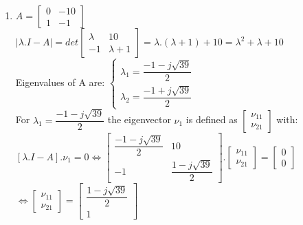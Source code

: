 \documentclass[14pt,a4paper]{article}
\begin{document}
\begin{enumerate}
	\item
		$A = \begin{bmatrix} 0&-10 \\ 1&-1 \end{bmatrix} $ \\
		$|\lambda .I - A| = det\begin{bmatrix} \lambda & 10 \\ -1 & \lambda +1 \end{bmatrix} = \lambda .(\lambda +1) +10 = \lambda^2 +\lambda +10 $ \\
		Eigenvalues of A are: 
		$\begin{cases} \lambda_1 = \dfrac{-1-j\sqrt{39}}{2}  \\ \lambda_2 = \dfrac{-1+j\sqrt{39}}{2}\end{cases} $ \\
		
		For $\lambda_1 = \dfrac{-1-j\sqrt{39}}{2}$ the eigenvector $\nu_1$ is defined as $\begin{bmatrix}\nu_{11}\\ \nu_{21} \end{bmatrix}$ with: \\
		$[\lambda .I - A].\nu_1 = 0 \Leftrightarrow \begin{bmatrix} \dfrac{-1-j\sqrt{39}}{2} & 10 \\ -1 & \dfrac{1-j\sqrt{39}}{2} \end{bmatrix} .\begin{bmatrix}\nu_{11}\\ \nu_{21} \end{bmatrix} = \begin{bmatrix} 0\\0 \end{bmatrix} $ \\
		$ \Leftrightarrow \begin{bmatrix} \nu_{11} \\\nu_{21}	\end{bmatrix} = \begin{bmatrix} \dfrac{1-j\sqrt{39}}{2}  \\ 1	\end{bmatrix}$ \\
		

\end{enumerate}
\end{document}
